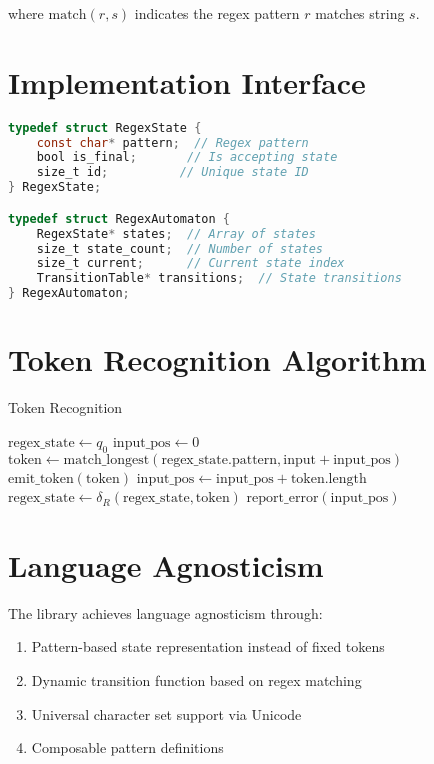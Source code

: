 \documentclass{article}
\begin{document}
where $\text{match}(r, s)$ indicates the regex pattern $r$ matches string $s$.

\section{Implementation Interface}
\begin{lstlisting}[language=C]
typedef struct RegexState {
    const char* pattern;  // Regex pattern
    bool is_final;       // Is accepting state
    size_t id;          // Unique state ID
} RegexState;

typedef struct RegexAutomaton {
    RegexState* states;  // Array of states
    size_t state_count;  // Number of states
    size_t current;      // Current state index
    TransitionTable* transitions;  // State transitions
} RegexAutomaton;
\end{lstlisting}

\section{Token Recognition Algorithm}
\begin{algorithm}
\caption{Token Recognition}
\begin{algorithmic}
\STATE $\text{regex\_state} \gets q_0$
\STATE $\text{input\_pos} \gets 0$
    \STATE $\text{token} \gets \text{match\_longest}(\text{regex\_state.pattern}, \text{input} + \text{input\_pos})$
        \STATE $\text{emit\_token}(\text{token})$
        \STATE $\text{input\_pos} \gets \text{input\_pos} + \text{token.length}$
        \STATE $\text{regex\_state} \gets \delta_R(\text{regex\_state}, \text{token})$
    \ELSE
        \STATE $\text{report\_error}(\text{input\_pos})$
        \RETURN
    \ENDIF
\ENDWHILE
\end{algorithmic}
\end{algorithm}

\section{Language Agnosticism}
The library achieves language agnosticism through:
\begin{enumerate}
\item Pattern-based state representation instead of fixed tokens
\item Dynamic transition function based on regex matching
\item Universal character set support via Unicode
\item Composable pattern definitions
\end{enumerate}
\end{document}

